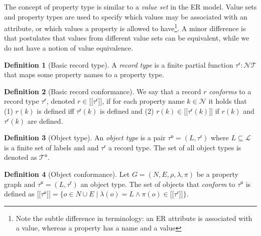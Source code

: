 \documentclass{article}
\makeatletter
\theoremstyle{definition}
\newtheorem{definition}{Definition}
\newcommand{\pto}{}%
\DeclareRobustCommand{\pto}{\mathrel{\mathpalette\p@to@gets\to}}
\newcommand{\p@to@gets}[2]{%
  \ooalign{\hidewidth$\m@th#1\mapstochar\mkern5mu$\hidewidth\cr$\m@th#1\to$\cr}%
}
\newcommand{\ptype}{\tau}
\newcommand{\ptypes}{\mathcal{T}}
\newcommand{\rtype}{\tau^\mathsf{r}}
\newcommand{\otype}{\tau^\mathsf{o}}
\newcommand{\otypes}{\mathcal{T}^\mathsf{o}}
\newcommand{\lsem}{\ensuremath{[\![}}
\newcommand{\rsem}{\ensuremath{]\!]}}
\newcommand{\sem}[1]{\ensuremath{\lsem #1 \rsem}}
\makeatother
\begin{document}
The concept of property type is similar to a \emph{value set} in the ER model. Value sets and property types are used to specify which values may be associated with an attribute, or which values a property is allowed to have\footnote{Note the subtle difference in terminology: an ER attribute is associated with a value, whereas a property has a name and a value}. A minor difference is that \citet{chen1976entity} postulates that values from different value sets can be equivalent, while we do not have a notion of value equivalence.

\begin{definition}[Basic record type]
  \label{def:record-type-basic}
  A \emph{record type} is a finite partial function $\rtype : \mathcal{N} \pto \ptypes$ that maps some property names to a property type.
\end{definition}

\begin{definition}[Basic record conformance]
  \label{def:record-conformance-basic}
  We say that a record $r$ \emph{conforms} to a record type $\rtype$, denoted $r \in \sem{\rtype}$, if for each property name $k \in \mathcal{N}$ it holds that (1) $r(k)$ is defined iff $\rtype(k)$ is defined and (2) $r(k) \in \sem{\rtype(k)}$ if $r(k)$ and $\rtype(k)$ are defined.
\end{definition}

\begin{definition}[Object type]
  \label{def:object-type}
  An \emph{object type} is a pair $\otype = (L, \rtype)$ where $L \subseteq \mathcal{L}$ is a finite set of labels and and $\rtype$ a record type.
  The set of all object types is denoted as $\otypes$.
\end{definition}

\begin{definition}[Object conformance]
  \label{def:object-conformance}
  Let $G = (N, E, \rho, \lambda, \pi)$ be a property graph and $\otype = (L, \rtype)$ an object type. The set of objects that \emph{conform} to $\otype$ is defined as $\sem{\otype} = \{o \in N \cup E \mid \lambda(o) = L \wedge \pi(o) \in \sem{\rtype}\}$.
\end{definition}
\end{document}
